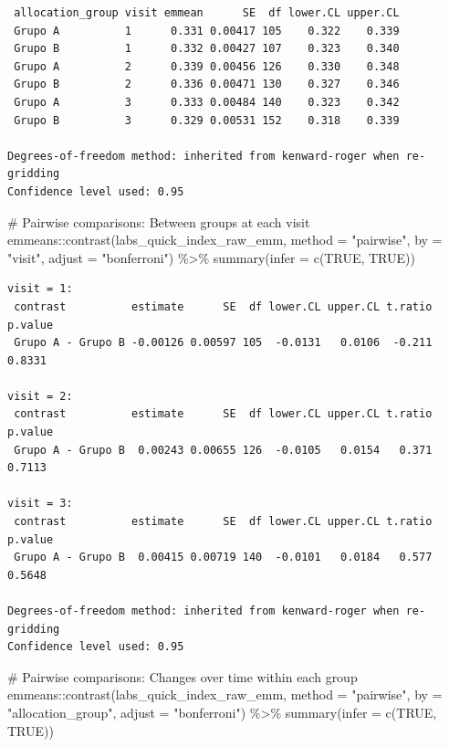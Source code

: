 \documentclass[
  letterpaper,
  DIV=11,
  numbers=noendperiod]{scrartcl}
\newenvironment{Shaded}{\begin{snugshade}}{\end{snugshade}}
\newcommand{\AttributeTok}[1]{\textcolor[rgb]{0.40,0.45,0.13}{#1}}
\newcommand{\CommentTok}[1]{\textcolor[rgb]{0.37,0.37,0.37}{#1}}
\newcommand{\ConstantTok}[1]{\textcolor[rgb]{0.56,0.35,0.01}{#1}}
\newcommand{\FunctionTok}[1]{\textcolor[rgb]{0.28,0.35,0.67}{#1}}
\newcommand{\NormalTok}[1]{\textcolor[rgb]{0.00,0.23,0.31}{#1}}
\newcommand{\SpecialCharTok}[1]{\textcolor[rgb]{0.37,0.37,0.37}{#1}}
\newcommand{\StringTok}[1]{\textcolor[rgb]{0.13,0.47,0.30}{#1}}
\begin{document}
\begin{verbatim}
 allocation_group visit emmean      SE  df lower.CL upper.CL
 Grupo A          1      0.331 0.00417 105    0.322    0.339
 Grupo B          1      0.332 0.00427 107    0.323    0.340
 Grupo A          2      0.339 0.00456 126    0.330    0.348
 Grupo B          2      0.336 0.00471 130    0.327    0.346
 Grupo A          3      0.333 0.00484 140    0.323    0.342
 Grupo B          3      0.329 0.00531 152    0.318    0.339

Degrees-of-freedom method: inherited from kenward-roger when re-gridding 
Confidence level used: 0.95 
\end{verbatim}

\begin{Shaded}
\begin{Highlighting}[]
\CommentTok{\# Pairwise comparisons: Between groups at each visit}
\NormalTok{emmeans}\SpecialCharTok{::}\FunctionTok{contrast}\NormalTok{(labs\_quick\_index\_raw\_emm, }\AttributeTok{method =} \StringTok{"pairwise"}\NormalTok{, }\AttributeTok{by =} \StringTok{"visit"}\NormalTok{, }\AttributeTok{adjust =} \StringTok{"bonferroni"}\NormalTok{) }\SpecialCharTok{\%\textgreater{}\%} \FunctionTok{summary}\NormalTok{(}\AttributeTok{infer =} \FunctionTok{c}\NormalTok{(}\ConstantTok{TRUE}\NormalTok{, }\ConstantTok{TRUE}\NormalTok{))}
\end{Highlighting}
\end{Shaded}

\begin{verbatim}
visit = 1:
 contrast          estimate      SE  df lower.CL upper.CL t.ratio p.value
 Grupo A - Grupo B -0.00126 0.00597 105  -0.0131   0.0106  -0.211  0.8331

visit = 2:
 contrast          estimate      SE  df lower.CL upper.CL t.ratio p.value
 Grupo A - Grupo B  0.00243 0.00655 126  -0.0105   0.0154   0.371  0.7113

visit = 3:
 contrast          estimate      SE  df lower.CL upper.CL t.ratio p.value
 Grupo A - Grupo B  0.00415 0.00719 140  -0.0101   0.0184   0.577  0.5648

Degrees-of-freedom method: inherited from kenward-roger when re-gridding 
Confidence level used: 0.95 
\end{verbatim}

\begin{Shaded}
\begin{Highlighting}[]
\CommentTok{\# Pairwise comparisons: Changes over time within each group}
\NormalTok{emmeans}\SpecialCharTok{::}\FunctionTok{contrast}\NormalTok{(labs\_quick\_index\_raw\_emm, }\AttributeTok{method =} \StringTok{"pairwise"}\NormalTok{, }\AttributeTok{by =} \StringTok{"allocation\_group"}\NormalTok{, }\AttributeTok{adjust =} \StringTok{"bonferroni"}\NormalTok{) }\SpecialCharTok{\%\textgreater{}\%} \FunctionTok{summary}\NormalTok{(}\AttributeTok{infer =} \FunctionTok{c}\NormalTok{(}\ConstantTok{TRUE}\NormalTok{, }\ConstantTok{TRUE}\NormalTok{))}
\end{Highlighting}
\end{Shaded}
\end{document}

